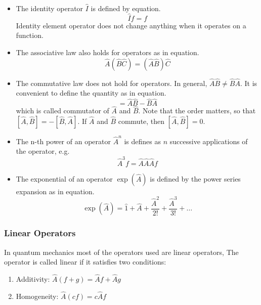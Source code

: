 \begin{itemize}
    \item The identity operator $\hat{I}$ is defined by equation.
        \begin{equation}
            \hat{I}f = f
            \label{eq:identity_operator}
        \end{equation}
          Identity element operator does not change anything when it operates on a function.
    \item The associative law also holds for operators as in equation.
        \begin{equation}
            \hat{A}(\hat{B}\hat{C}) = (\hat{A}\hat{B})\hat{C}
            \label{eq:associative_operator}
        \end{equation}
    \item The commutative law does not hold for operators. In general, $\hat{A}\hat{B} \neq \hat{B}\hat{A}$.  It is convenient to define the quantity as in equation.
        \begin{equation}
            [\hat{A}, \hat{B}] = \hat{A}\hat{B} - \hat{B}\hat{A}
            \label{eq:commutator_operator}
        \end{equation}
            which is called commutator of $\hat{A}$ and $\hat{B}$. Note that the order matters, so that $[\hat{A}, \hat{B}] = -[\hat{B}, \hat{A}]$. If $\hat{A}$ and $\hat{B}$ commute, then $[\hat{A}, \hat{B}] = 0$.
    \item The n-th power of an operator $\hat{A}^n$ is defines as $n$ successive applications of the operator, e.g.
        \begin{equation}
            \hat{A}^3f = \hat{A}\hat{A}\hat{A}f
            \label{eq:power_operator}
        \end{equation}
    \item The exponential of an operator $\exp(\hat{A})$ is defined by the power series expansion as in equation.
        \begin{equation}
            \exp(\hat{A}) = \hat{1} + \hat{A} + \frac{\hat{A}^2}{2!} + \frac{\hat{A}^3}{3!} + \ldots
            \label{eq:exponential_operator}
        \end{equation}
\end{itemize}


\subsubsection{Linear Operators}
In quantum mechanics most of the operators used are linear operators, The operator is called linear if it satisfies two conditions:
\begin{enumerate}
  \centering
  \item Additivity: $\hat{A}(f + g) = \hat{A}f + \hat{A}g$ 
    \label{eq:additivity}
  \item Homogeneity: $\hat{A}(cf) = c\hat{A}f$
    \label{eq:homogeneity}
\end{enumerate}

